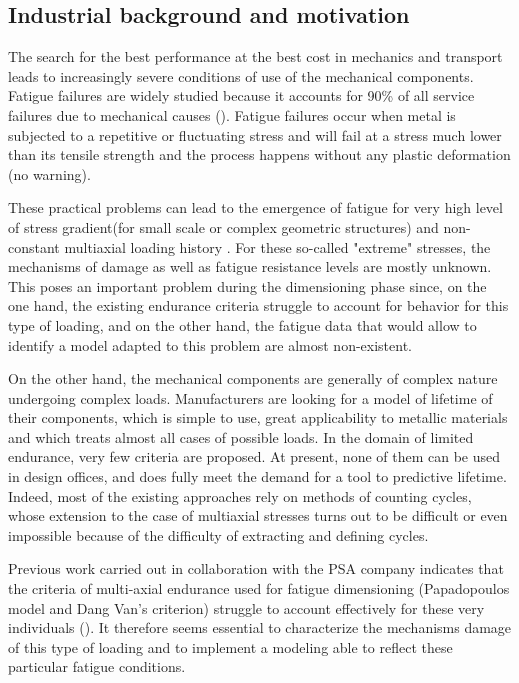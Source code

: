 \subsection{Industrial background and motivation}
The search for the best performance at the best cost in mechanics and
transport leads to increasingly
severe conditions of use of the mechanical components. Fatigue failures are widely studied
because it accounts for 90\% of all service
failures due to mechanical causes (\cite{sohar2011lifetime}).  Fatigue failures occur when metal is
subjected to a repetitive or fluctuating
stress and will fail at a stress much lower
than its tensile strength and the process happens without any plastic
deformation (no warning).

These practical problems can lead to the emergence of fatigue for
very high level of stress gradient(for small scale or complex geometric structures) and non-constant multiaxial loading history
. For these so-called "extreme" stresses, the mechanisms of damage
as well as fatigue resistance levels are mostly unknown.
This poses an important problem during the dimensioning phase since, on the one hand, the
existing endurance criteria struggle to account for behavior for this type of
loading, and on the other hand, the fatigue data that would allow to identify a model
adapted to this problem are almost non-existent.

On the other hand, the mechanical components are generally of complex nature undergoing
complex loads. Manufacturers are looking for a model of lifetime
of their components, which is simple to use, great applicability to metallic materials
and which treats almost all cases of possible loads. In the domain of
limited endurance, very few criteria are proposed. At present, none of them
can be used in design offices, and does fully meet the demand for a tool to
predictive lifetime. Indeed, most of the existing approaches rely on
methods of counting cycles, whose extension to the case of multiaxial stresses turns out to be
difficult or even impossible because of the difficulty of extracting and defining cycles.

Previous work carried out in collaboration with the PSA company indicates that the criteria
of multi-axial endurance used for fatigue dimensioning (Papadopoulos model
and Dang Van's criterion) struggle to account effectively for these very
individuals (\cite{koutiri2011effet}). It therefore seems essential to characterize the mechanisms
damage of this type of loading and to implement a modeling
able to reflect these particular fatigue conditions.

